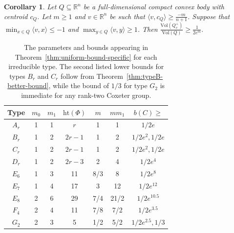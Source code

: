 \documentclass{amsart}
\newcommand{\height}{\mathrm{ht}}
\newcommand{\R}{\mathbb{R}}
\newcommand{\Vol}{\mathrm{Vol}}
\newtheorem{cor}[theorem]{Corollary}
\theoremstyle{definition}
\theoremstyle{remark}
\begin{document}
\begin{cor}\label{cor:bm}
Let $Q\subseteq\R^n$ be a full-dimensional compact convex body with centroid $c_Q$. Let $m\geq1$ and $v\in\R^n$ be such that $\langle v,c_Q\rangle\geq\frac{-m}{n+1}$. Suppose that $\min_{x\in Q}\langle v,x\rangle\leq-1$ and $\max_{y\in Q}\langle v,y\rangle\geq1$. Then
$\frac{\Vol(Q_v^+)}{\Vol(Q)}\geq\frac{1}{2e^m}.$
\end{cor}

\begin{table}[ht!]
\centering
\begin{tabular}{|c|c|c|c|c||c|c|}
\hline
Type & $m_0$ & $m_1$ & $\height(\Phi)$ & $m$ & $mm_1$ & $b(C)\geq$\\\hline
$A_r$ & 1 & 1 & $r$ & 1 & 1 & $1/2e$  \\\hline
$B_r$ & 1 & 2 & $2r-1$ & 1 & 2 & $1/2e^2,1/2e$ \\\hline
$C_r$ & 1 & 2 & $2r-1$ & 1 & 2 & $1/2e^2,1/2e$ \\\hline
$D_r$ & 1 & 2 & $2r-3$ & 2 & 4 & $1/2e^4$\\\hline
$E_6$ & 1 & 3 & 11 & 8/3 & 8 & $1/2e^8$\\\hline
$E_7$ & 1 & 4 & 17 & 3 & 12 & $1/2e^{12}$\\\hline
$E_8$ & 2 & 6 & 29 & 7/4 & 21/2 & $1/2e^{10.5}$\\\hline
$F_4$ & 2 & 4 & 11 & 7/8 & 7/2 & $1/2e^{3.5}$ \\\hline
$G_2$ & 2 & 3 & 5 & 1/2 & 5/2 & $1/2e^{2.5}, 1/3$ \\\hline
\end{tabular}
\caption{The parameters and bounds appearing in Theorem~\ref{thm:uniform-bound-specific} for each irreducible type.  The second listed lower bounds for types $B_r$ and $C_r$ follow from Theorem~\ref{thm:typeB-better-bound}, while the bound of $1/3$ for type $G_2$ is immediate for any rank-two Coxeter group.}
\label{tab:centroid-data}
\end{table}
\end{document}
